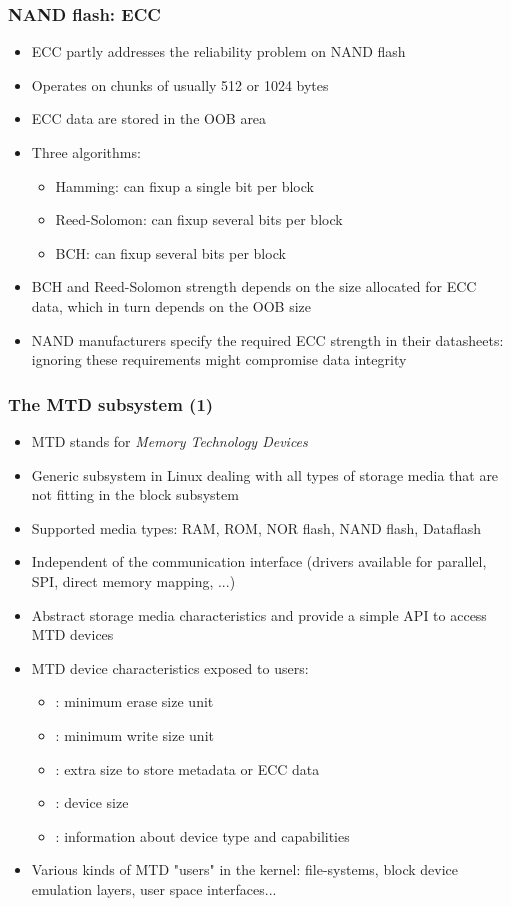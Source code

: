 \begin{frame}
  \frametitle{NAND flash: ECC}
  \begin{itemize}
  \item ECC partly addresses the reliability problem on NAND flash
  \item Operates on chunks of usually 512 or 1024 bytes
  \item ECC data are stored in the OOB area
  \item Three algorithms:
    \begin{itemize}
    \item Hamming: can fixup a single bit per block
    \item Reed-Solomon: can fixup several bits per block
    \item BCH: can fixup several bits per block
    \end{itemize}
  \item BCH and Reed-Solomon strength depends on the size allocated
    for ECC data, which in turn depends on the OOB size
  \item NAND manufacturers specify the required ECC strength in their
    datasheets: ignoring these requirements might compromise data
    integrity
  \end{itemize}
\end{frame}

\begin{frame}
  \frametitle{The MTD subsystem (1)}
  \begin{itemize}
  \item MTD stands for {\em Memory Technology Devices}
  \item Generic subsystem in Linux dealing with all types of storage media that
    are not fitting in the block subsystem
  \item Supported media types: RAM, ROM, NOR flash, NAND flash,
    Dataflash
  \item Independent of the communication interface (drivers available
    for parallel, SPI, direct memory mapping, ...)
  \item Abstract storage media characteristics and provide a simple
    API to access MTD devices
  \item MTD device characteristics exposed to users:
    \begin{itemize}
    \item {}: minimum erase size unit
    \item {}: minimum write size unit
    \item {}: extra size to store metadata or ECC data
    \item {}: device size
    \item {}: information about device type and capabilities
    \end{itemize}
  \item Various kinds of MTD "users" in the kernel: file-systems, block
    device emulation layers, user space interfaces...
  \end{itemize}
\end{frame}

